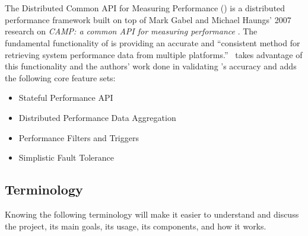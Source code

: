 \chapter{\dcamp}
\label{dcamp}

The Distributed Common API for Measuring Performance (\dcamp) is a distributed performance framework built on top of Mark Gabel and Michael Haungs' 2007 research on \emph{CAMP: a common API for measuring performance} \cite{gabel2007}. The fundamental functionality of \camp is providing an accurate and ``consistent method for retrieving system performance data from multiple platforms.'' \dcamp\ takes advantage of this functionality and the authors' work done in validating \camp's accuracy and adds the following core feature sets:
\begin{itemize}
\item Stateful Performance API
\item Distributed Performance Data Aggregation
\item Performance Filters and Triggers
\item Simplistic Fault Tolerance
\end{itemize}

\section{Terminology}
Knowing the following terminology will make it easier to understand and discuss the \dcamp project, its main goals, its usage, its components, and how it works. 

